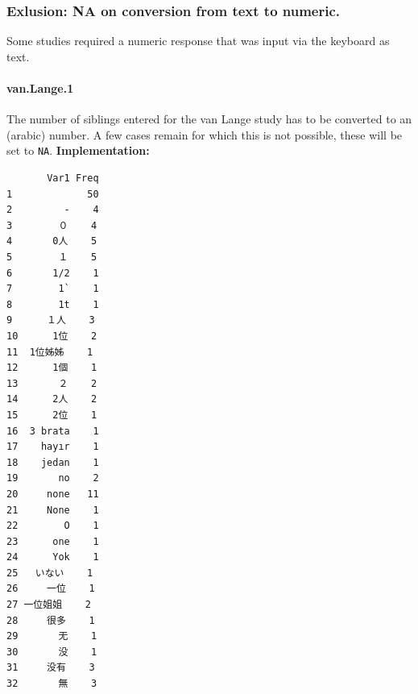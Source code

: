 \documentclass[]{article}
\newenvironment{Shaded}{\begin{snugshade}}{\end{snugshade}}
\newcommand{\KeywordTok}[1]{\textcolor[rgb]{0.94,0.87,0.69}{{#1}}}
\newcommand{\StringTok}[1]{\textcolor[rgb]{0.80,0.58,0.58}{{#1}}}
\newcommand{\CommentTok}[1]{\textcolor[rgb]{0.50,0.62,0.50}{{#1}}}
\newcommand{\NormalTok}[1]{\textcolor[rgb]{0.80,0.80,0.80}{{#1}}}
\begin{document}
\subsubsection{\textbf{Exlusion:} NA on conversion from text to
numeric.}\label{exlusion-na-on-conversion-from-text-to-numeric.}

Some studies required a numeric response that was input via the keyboard
as text.

\paragraph{van.Lange.1}\label{van.lange.1}

The number of siblings entered for the van Lange study has to be
converted to an (arabic) number. A few cases remain for which this is
not possible, these will be set to \texttt{NA}. \textbf{Implementation:}

\begin{Shaded}
\end{Shaded}

\begin{verbatim}
       Var1 Freq
1             50
2         -    4
3        ０    4
4       0人    5
5        １    5
6       1/2    1
7        1`    1
8        1t    1
9      １人    3
10      1位    2
11  1位姊姊    1
12      1個    1
13       ２    2
14      2人    2
15      2位    1
16  3 brata    1
17    hayır    1
18    jedan    1
19       no    2
20     none   11
21     None    1
22        O    1
23      one    1
24      Yok    1
25   いない    1
26     一位    1
27 一位姐姐    2
28     很多    1
29       无    1
30       没    1
31     没有    3
32       無    3
\end{verbatim}

\begin{Shaded}
\end{Shaded}
\end{document}
